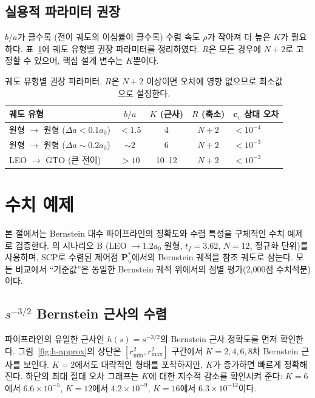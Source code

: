 \documentclass[11pt]{article}
\begin{document}
\subsection{실용적 파라미터 권장}

$b/a$가 클수록 (전이 궤도의 이심률이 클수록) 수렴 속도 $\rho$가 작아져
더 높은 $K$가 필요하다.
표~\ref{tab:params}에 궤도 유형별 권장 파라미터를 정리하였다.
$R$은 모든 경우에 $N{+}2$로 고정할 수 있으며,
핵심 설계 변수는 $K$뿐이다.

\begin{table}[h]
\centering
\caption{궤도 유형별 권장 파라미터.
  $R$은 $N{+}2$ 이상이면 오차에 영향 없으므로 최소값으로 설정한다.}
\label{tab:params}
\small
\begin{tabular}{@{}lcccl@{}}
\toprule
궤도 유형 & $b/a$ & $K$ (근사) & $R$ (축소) & $\mathbf{c}_v$ 상대 오차 \\
\midrule
원형 $\to$ 원형 ($\Delta a < 0.1 a_0$) & $<1.5$ & 4 & $N{+}2$ & $< 10^{-4}$ \\
원형 $\to$ 원형 ($\Delta a \sim 0.2 a_0$) & $\sim 2$ & 6 & $N{+}2$ & $< 10^{-3}$ \\
LEO $\to$ GTO (큰 전이) & $>10$ & 10--12 & $N{+}2$ & $< 10^{-3}$ \\
\bottomrule
\end{tabular}
\end{table}

\section{수치 예제}
\label{sec:numerical}

본 절에서는 Bernstein 대수 파이프라인의 정확도와 수렴 특성을
구체적인 수치 예제로 검증한다.
\cite{report008}의 시나리오 B
(LEO $\to 1.2 a_0$ 원형, $t_f=3.62$, $N=12$, 정규화 단위)를 사용하며,
SCP로 수렴된 제어점 $\mathbf{P}_u^*$에서의 Bernstein 궤적을 참조 궤도로 삼는다.
모든 비교에서 ``기준값''은 동일한 Bernstein 궤적 위에서의
점별 평가(2,000점 수치적분)이다.

\subsection{$s^{-3/2}$ Bernstein 근사의 수렴}

파이프라인의 유일한 근사인 $h(s) = s^{-3/2}$의 Bernstein 근사 정확도를 먼저 확인한다.
그림~\ref{fig:h-approx}의 상단은 $[r_\mathrm{min}^2, r_\mathrm{max}^2]$ 구간에서
$K=2, 4, 6, 8$차 Bernstein 근사를 보인다.
$K=2$에서도 대략적인 형태를 포착하지만, $K$가 증가하면 빠르게 정확해진다.
하단의 최대 절대 오차 그래프는 $K$에 대한 지수적 감소를 확인시켜 준다:
$K=6$에서 $6.6 \times 10^{-5}$, $K=12$에서 $4.2 \times 10^{-9}$,
$K=16$에서 $6.3 \times 10^{-12}$이다.
\end{document}
